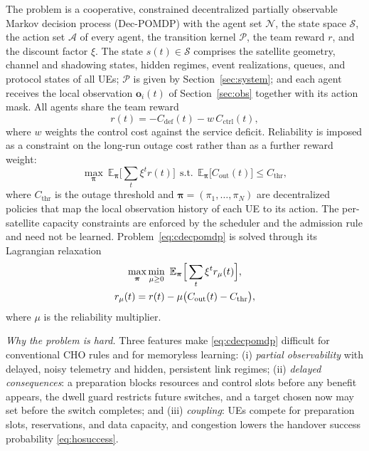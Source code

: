 \documentclass[journal]{IEEEtran}
\newcommand{\Nset}{\mathcal{N}}
\newcommand{\Aset}{\mathcal{A}}
\newcommand{\E}{\mathbb{E}}
\begin{document}
The problem is a cooperative, constrained decentralized partially observable
Markov decision process (Dec-POMDP) with the agent set $\Nset$, the state
space $\mathcal{S}$, the action set $\Aset$ of every agent, the transition
kernel $\mathcal{P}$, the team reward $r$, and the discount factor $\xi$. The
state $s(t)\in\mathcal{S}$ comprises the satellite geometry, channel and
shadowing states, hidden regimes, event realizations, queues, and protocol
states of all UEs; $\mathcal{P}$ is given by Section~\ref{sec:system}; and
each agent receives the local observation $\mathbf{o}_i(t)$ of
Section~\ref{sec:obs} together with its action mask. All agents share the team
reward
\begin{equation}
r(t) = -C_{\mathrm{def}}(t) - w\,C_{\mathrm{ctrl}}(t),
\label{eq:reward}
\end{equation}
where $w$ weights the control cost against the service deficit. Reliability
is imposed as a constraint on the long-run outage cost rather than as a
further reward weight:
\begin{equation}
\max_{\boldsymbol\pi}\ \E_{\boldsymbol\pi}\Big[\sum_{t}\xi^t r(t)\Big]
\ \ \text{s.t.}\ \ \E_{\boldsymbol\pi}\big[C_{\mathrm{out}}(t)\big]\le C_{\mathrm{thr}},
\label{eq:cdecpomdp}
\end{equation}
where $C_{\mathrm{thr}}$ is the outage threshold and
$\boldsymbol\pi=(\pi_1,\dots,\pi_N)$ are decentralized policies that map the
local observation history of each UE to its action. The per-satellite
capacity constraints are enforced by the scheduler and the admission rule and
need not be learned. Problem~\eqref{eq:cdecpomdp} is solved through its
Lagrangian relaxation
\begin{gather}
\max_{\boldsymbol\pi}\min_{\mu\ge0}\ \E_{\boldsymbol\pi}\Big[\sum_t\xi^t r_\mu(t)\Big],\label{eq:lagrangian}\\
r_\mu(t)=r(t)-\mu\big(C_{\mathrm{out}}(t)-C_{\mathrm{thr}}\big),\notag
\end{gather}
where $\mu$ is the reliability multiplier.

\emph{Why the problem is hard.} Three features make \eqref{eq:cdecpomdp}
difficult for conventional CHO rules and for memoryless learning:
(i) \emph{partial observability} with delayed, noisy telemetry and hidden,
persistent link regimes; (ii) \emph{delayed consequences}: a preparation
blocks resources and control slots before any benefit appears, the dwell guard
restricts future switches, and a target chosen now may set before the switch
completes; and (iii) \emph{coupling}: UEs compete for preparation slots,
reservations, and data capacity, and congestion lowers the handover success
probability \eqref{eq:hosuccess}.
\end{document}
